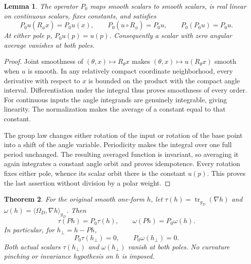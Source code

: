 \documentclass[11pt]{article}
\newtheorem{theorem}{Theorem}[section]
\newtheorem{lemma}[theorem]{Lemma}
\begin{document}
\begin{lemma}\label{lem:scalar-haar-projector}
The operator $P_0$ maps smooth scalars to smooth scalars, is real linear on
continuous scalars, fixes constants, and satisfies
\[
 P_0u(R_\phi x)=P_0u(x),\qquad
 P_0(u\circ R_\phi)=P_0u,\qquad P_0(P_0u)=P_0u.
\]
At either pole $p$, $P_0u(p)=u(p)$. Consequently a scalar with zero angular
average vanishes at both poles.
\end{lemma}

\begin{proof}
Joint smoothness of $(\theta,x)\mapsto R_\theta x$ makes
$(\theta,x)\mapsto u(R_\theta x)$ smooth when $u$ is smooth. In any relatively
compact coordinate neighborhood, every derivative with respect to $x$ is
bounded on the product with the compact angle interval. Differentiation under
the integral thus proves smoothness of every order. For continuous inputs the
angle integrands are genuinely integrable, giving linearity. The normalization
makes the average of a constant equal to that constant.

The group law changes either rotation of the input or rotation of the base
point into a shift of the angle variable. Periodicity makes the integral over
one full period unchanged. The resulting averaged function is invariant,
so averaging it again integrates a constant angle orbit and proves idempotence.
Every rotation fixes either pole, whence its scalar orbit there is the constant
$u(p)$. This proves the last assertion without division by a polar weight.
\end{proof}

\begin{theorem}\label{thm:scalar-haar-compatibility}
For the original smooth one-form $h$, let
$\tau(h)=\operatorname{tr}_{g_D}(\nabla h)$ and
$\omega(h)=\langle\Omega_D,\nabla h\rangle_{g_D}$. Then
\[
 \tau(Ph)=P_0\tau(h),\qquad \omega(Ph)=P_0\omega(h).
\]
In particular, for $h_\perp=h-Ph$,
\begin{equation}\label{eq:remainder-scalar-means}
 P_0\tau(h_\perp)=0,\qquad P_0\omega(h_\perp)=0.
\end{equation}
Both actual scalars $\tau(h_\perp)$ and $\omega(h_\perp)$ vanish at both poles.
No curvature pinching or invariance hypothesis on $h$ is imposed.
\end{theorem}
\end{document}
